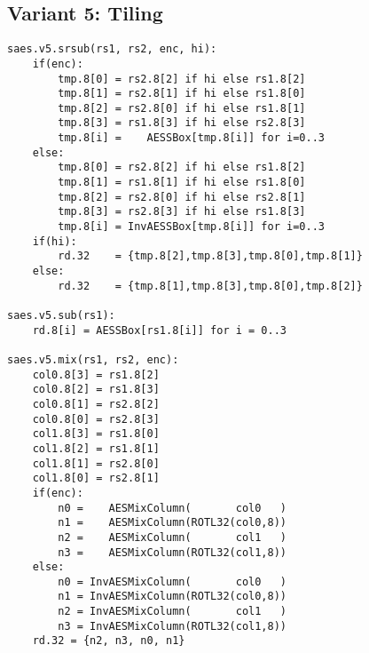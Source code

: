 \subsection{Variant 5: Tiling}

\begin{lstlisting}[language=pseudo]
saes.v5.srsub(rs1, rs2, enc, hi):
    if(enc):
        tmp.8[0] = rs2.8[2] if hi else rs1.8[2]
        tmp.8[1] = rs2.8[1] if hi else rs1.8[0]
        tmp.8[2] = rs2.8[0] if hi else rs1.8[1]
        tmp.8[3] = rs1.8[3] if hi else rs2.8[3]
        tmp.8[i] =    AESSBox[tmp.8[i]] for i=0..3
    else:
        tmp.8[0] = rs2.8[2] if hi else rs1.8[2]
        tmp.8[1] = rs1.8[1] if hi else rs1.8[0]
        tmp.8[2] = rs2.8[0] if hi else rs2.8[1]
        tmp.8[3] = rs2.8[3] if hi else rs1.8[3]
        tmp.8[i] = InvAESSBox[tmp.8[i]] for i=0..3
    if(hi):
        rd.32    = {tmp.8[2],tmp.8[3],tmp.8[0],tmp.8[1]}
    else:
        rd.32    = {tmp.8[1],tmp.8[3],tmp.8[0],tmp.8[2]}

saes.v5.sub(rs1):
    rd.8[i] = AESSBox[rs1.8[i]] for i = 0..3

saes.v5.mix(rs1, rs2, enc):
    col0.8[3] = rs1.8[2]
    col0.8[2] = rs1.8[3]
    col0.8[1] = rs2.8[2]
    col0.8[0] = rs2.8[3]
    col1.8[3] = rs1.8[0]
    col1.8[2] = rs1.8[1]
    col1.8[1] = rs2.8[0]
    col1.8[0] = rs2.8[1]
    if(enc):
        n0 =    AESMixColumn(       col0   )
        n1 =    AESMixColumn(ROTL32(col0,8))
        n2 =    AESMixColumn(       col1   )
        n3 =    AESMixColumn(ROTL32(col1,8))
    else:
        n0 = InvAESMixColumn(       col0   )
        n1 = InvAESMixColumn(ROTL32(col0,8))
        n2 = InvAESMixColumn(       col1   )
        n3 = InvAESMixColumn(ROTL32(col1,8))
    rd.32 = {n2, n3, n0, n1}
\end{lstlisting}
